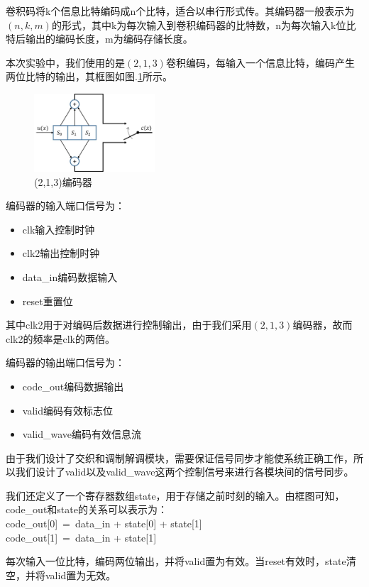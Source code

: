 卷积码将k个信息比特编码成n个比特，适合以串行形式传。其编码器一般表示为$(n,k,m)$的形式，其中k为每次输入到卷积编码器的比特数，n为每次输入k位比特后输出的编码长度，m为编码存储长度。

本次实验中，我们使用的是$(2,1,3)$卷积编码，每输入一个信息比特，编码产生两位比特的输出，其框图如图.\ref{fig:encoder}所示。

\begin{figure}[htb]
\centering
\includegraphics[width=0.4\textwidth]{images//encoder.jpg}
\caption{(2,1,3)编码器}
\label{fig:encoder}
\end{figure}

编码器的输入端口信号为：
\begin{itemize}
\item clk\quad        输入控制时钟
\item clk2\quad       输出控制时钟
\item data\_in\quad    编码数据输入
\item reset\quad    重置位
\end{itemize}
其中clk2用于对编码后数据进行控制输出，由于我们采用$(2,1,3)$编码器，故而clk2的频率是clk的两倍。

编码器的输出端口信号为：
\begin{itemize}
\item code\_out\quad        编码数据输出
\item valid\quad       编码有效标志位
\item valid\_wave\quad    编码有效信息流
\end{itemize}
由于我们设计了交织和调制解调模块，需要保证信号同步才能使系统正确工作，所以我们设计了valid以及valid\_wave这两个控制信号来进行各模块间的信号同步。

我们还定义了一个寄存器数组state，用于存储之前时刻的输入。由框图可知，code\_out和state的关系可以表示为：\\
\quad\quad\quad code\_out[0]~=~data\_in + state[0] + state[1]\\
\quad\quad\quad code\_out[1]~=~data\_in + state[1]

每次输入一位比特，编码两位输出，并将valid置为有效。当reset有效时，state清空，并将valid置为无效。

